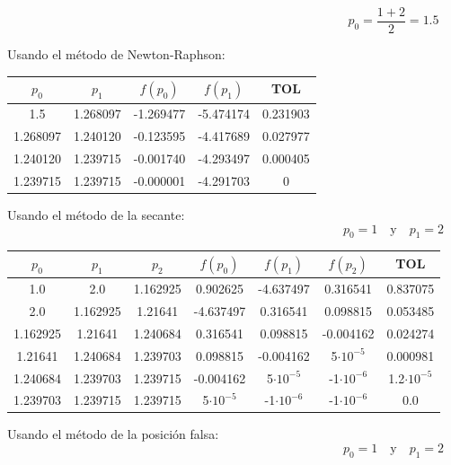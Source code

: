 \documentclass[12pt]{article}
\begin{document}
\begin{enumerate}
\begin{enumerate}
        \[p_0 = \frac{1 + 2}{2} = 1.5\]

        Usando el método de Newton-Raphson:


        \begin{center}
        \begin{tabular}{|c|c|c|c|c|}
        \hline
        \(p_0\) & \(p_1\)& \(f(p_0)\) & \(f(p_1)\) & \textbf{TOL} \\
        \hline
        1.5 & 1.268097 & -1.269477 & -5.474174 &  0.231903 \\
        1.268097 & 1.240120 & -0.123595 & -4.417689 &  0.027977 \\
        1.240120 & 1.239715 & -0.001740 & -4.293497 &  0.000405 \\
        1.239715 & 1.239715 & -0.000001 & -4.291703 &  0 \\
        \hline 
        \end{tabular}
        \end{center}
    \end{enumerate}
    
    Usando el método de la secante:
    \[p_0 = 1 \quad \text{y} \quad p_1 = 2\]
    \begin{center}
        \begin{tabular}{|c|c|c|c|c|c|c|}
        \hline
        \(p_0\) & \(p_1\)& \(p_2\)&\(f(p_0)\) & \(f(p_1)\) & \(f(p_2)\)& \textbf{TOL} \\
        \hline
        1.0 & 2.0 & 1.162925 & 0.902625 & -4.637497 & 0.316541 & 0.837075 \\
        2.0 & 1.162925 & 1.21641 & -4.637497 & 0.316541 & 0.098815 & 0.053485 \\
        1.162925 & 1.21641 & 1.240684 & 0.316541 & 0.098815 & -0.004162 & 0.024274 \\
        1.21641 & 1.240684 & 1.239703 & 0.098815 & -0.004162 & 5\(\cdot 10^{-5}\) & 0.000981 \\
        1.240684 & 1.239703 & 1.239715 & -0.004162 & 5\(\cdot 10^{-5}\) & -1\(\cdot 10^{-6}\) & 1.2\(\cdot 10^{-5}\) \\
        1.239703 & 1.239715 & 1.239715 & 5\(\cdot 10^{-5}\) & -1\(\cdot 10^{-6}\) & -1\(\cdot 10^{-6}\) & 0.0 \\
        \hline 
        \end{tabular}
    \end{center}

    Usando el método de la posición falsa:
    \[p_0 = 1 \quad \text{y} \quad p_1 = 2\]


\end{enumerate}
\end{document}
